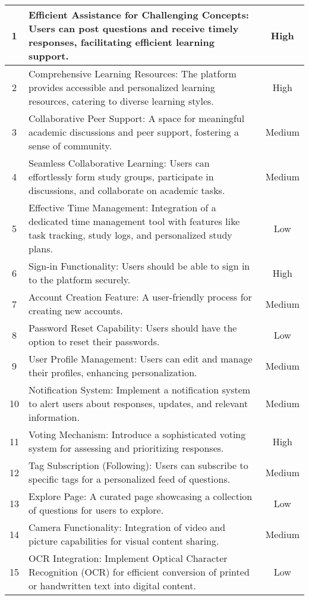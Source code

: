 \begin{longtable}{|c|p{8cm}|c|}
    1 & Efficient Assistance for Challenging Concepts: Users can post questions and receive timely responses, facilitating efficient learning support. & High \\
    \hline
    2 & Comprehensive Learning Resources: The platform provides accessible and personalized learning resources, catering to diverse learning styles. & High \\
    \hline
    3 & Collaborative Peer Support: A space for meaningful academic discussions and peer support, fostering a sense of community. & Medium \\
    \hline
    4 & Seamless Collaborative Learning: Users can effortlessly form study groups, participate in discussions, and collaborate on academic tasks. & Medium \\
    \hline
    5 & Effective Time Management: Integration of a dedicated time management tool with features like task tracking, study logs, and personalized study plans. & Low \\
    \hline
    6 & Sign-in Functionality: Users should be able to sign in to the platform securely. & High \\
    \hline
    7 & Account Creation Feature: A user-friendly process for creating new accounts. & Medium \\
    \hline
    8 & Password Reset Capability: Users should have the option to reset their passwords. & Low \\
    \hline
    9 & User Profile Management: Users can edit and manage their profiles, enhancing personalization. & Medium \\
    \hline
    10 & Notification System: Implement a notification system to alert users about responses, updates, and relevant information. & Medium \\
    \hline
    11 & Voting Mechanism: Introduce a sophisticated voting system for assessing and prioritizing responses. & High \\
    \hline
    12 & Tag Subscription (Following): Users can subscribe to specific tags for a personalized feed of questions. & Medium \\
    \hline
    13 & Explore Page: A curated page showcasing a collection of questions for users to explore. & Low \\
    \hline
    14 & Camera Functionality: Integration of video and picture capabilities for visual content sharing. & Medium \\
    \hline
    15 & OCR Integration: Implement Optical Character Recognition (OCR) for efficient conversion of printed or handwritten text into digital content. & Low \\
\end{longtable}



